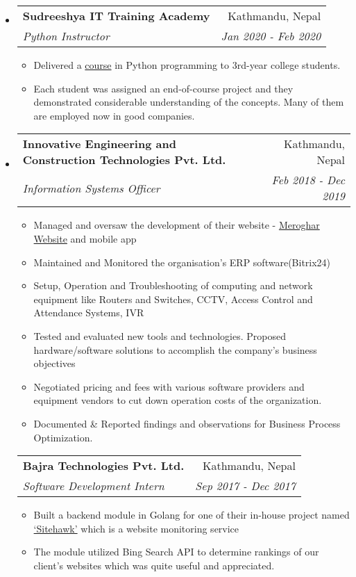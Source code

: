 \documentclass[letterpaper,11pt]{article}
\makeatletter
\newcommand{\cvsubheading}[4]{
\begin{tabular*}{6.5in}{l@{\cftdotfill{\cftsecdotsep}\extracolsep{\fill}}r}
        \textbf{#1} & #2 \\
        \textit{#3} & \textit{#4} \\
\end{tabular*}\vspace{-6pt}}
\newcommand{\cvitem}[1]{\item #1 \vspace{-2pt}}
\makeatother
\begin{document}
\begin{itemize}
      \item
            \cvsubheading{Sudreeshya IT Training Academy}{Kathmandu, Nepal}{Python Instructor}{Jan 2020 - Feb 2020}
            \begin{itemize}
                  \cvitem{Delivered a \href{https://github.com/leabstrait/basic-python-class}{course} in Python programming to 3rd-year college students.}
                  \cvitem{Each student was assigned an end-of-course project and they demonstrated considerable understanding of the concepts. Many of them are employed now in good companies.}
            \end{itemize}

      \item
            \cvsubheading{Innovative Engineering and Construction Technologies Pvt. Ltd.}{Kathmandu, Nepal}{Information Systems Officer}{Feb 2018  - Dec 2019}
            \begin{itemize}
                  \cvitem{Managed and oversaw the development of their website - \href{https://meroghar.com}{Meroghar Website} and mobile app}
                  \cvitem{Maintained and Monitored the organisation’s ERP software(Bitrix24)}
                  \cvitem{Setup, Operation and Troubleshooting of computing and network equipment like Routers and Switches, CCTV, Access Control and Attendance Systems, IVR}
                  \cvitem{Tested and evaluated new tools and technologies. Proposed hardware/software solutions to accomplish the company's business objectives}
                  \cvitem{Negotiated pricing and fees with various software providers and equipment vendors to cut down operation costs of the organization.}
                  \cvitem{Documented \& Reported findings and observations for Business Process Optimization.}
            \end{itemize}
            \cvsubheading{Bajra Technologies Pvt. Ltd.}{Kathmandu, Nepal}{Software Development Intern}{Sep 2017 - Dec 2017}
            \begin{itemize}
                  \cvitem{Built a backend module in Golang for one of their in-house project named \href{https://sitehawk.io}{‘Sitehawk’} which is a website monitoring service}
                  \cvitem{The module utilized Bing Search API to determine rankings of our client's websites which was quite useful and appreciated.}
            \end{itemize}


\end{itemize}
\end{document}
